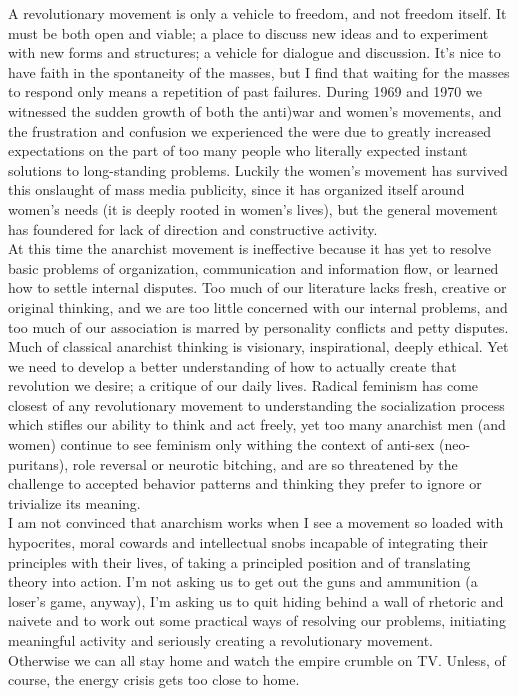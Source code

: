 \documentclass[12pt, onecolumn, letterpaper, oneside]{book}
\begin{document}
A revolutionary movement is only a vehicle to freedom, and not freedom itself. It must be both open and viable; a place to discuss new ideas and to experiment with new forms and structures; a vehicle for dialogue and discussion. It's nice to have faith in the spontaneity of the masses, but I find that waiting for the masses to respond only means a repetition of past failures. During 1969 and 1970 we witnessed the sudden growth of both the anti)war and women's movements, and the frustration and confusion we experienced the were due to greatly increased expectations on the part of too many people who literally expected instant solutions to long-standing problems. Luckily the women's movement has survived this onslaught of mass media publicity, since it has organized itself around women's needs (it is deeply rooted in women's lives), but the general movement has foundered for lack of direction and constructive activity.\\
At this time the anarchist movement is ineffective because it has yet to resolve basic problems of organization, communication and information flow, or learned how to settle internal disputes. Too much of our literature lacks fresh, creative or original thinking, and we are too little concerned with our internal problems, and too much of our association is marred by personality conflicts and petty disputes.\\
Much of classical anarchist thinking is visionary, inspirational, deeply ethical. Yet we need to develop a better understanding of how to actually create that revolution we desire; a critique of our daily lives. Radical feminism has come closest of any revolutionary movement to understanding the socialization process which stifles our ability to think and act freely, yet too many anarchist men (and women) continue to see feminism only withing the context of anti-sex (neo-puritans), role reversal or neurotic bitching, and are so threatened by the challenge to accepted behavior patterns and thinking they prefer to ignore or trivialize its meaning.\\
I am not convinced that anarchism works when I see a movement so loaded with hypocrites, moral cowards and intellectual snobs incapable of integrating their principles with their lives, of taking a principled position and of translating theory into action. I'm not asking us to get out the guns and ammunition (a loser's game, anyway), I'm asking us to quit hiding behind a wall of rhetoric and naivete and to work out some practical ways of resolving our problems, initiating meaningful activity and seriously creating a revolutionary movement.\\
Otherwise we can all stay home and watch the empire crumble on TV. Unless, of course, the energy crisis gets too close to home.
\end{document}
